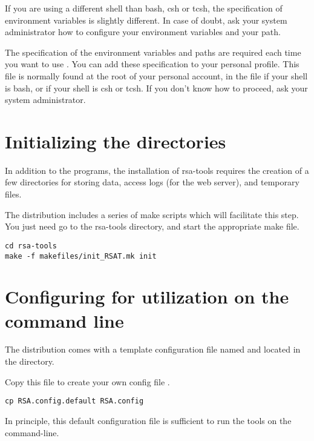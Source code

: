 \documentclass{article}
\begin{document}
If you are using a different shell than bash, csh or tcsh, the
specification of environment variables is slightly different.  In case
of doubt, ask your system administrator how to configure your
environment variables and your path.

The specification of the environment variables and paths are required
each time you want to use \RSAT. You can add these specification to
your personal profile.  This file is normally found at the root of
your personal account, in the file  if your shell is
bash, or  if your shell is csh or tcsh. If you don't know
how to proceed, ask your system administrator.



\section{Initializing the directories}

In addition to the programs, the installation of rsa-tools requires
the creation of a few directories for storing data, access logs (for
the web server), and temporary files.  

The distribution includes a series of make scripts which will
facilitate this step. You just need go to the rsa-tools directory, and
start the appropriate make file.

\begin{verbatim}
cd rsa-tools
make -f makefiles/init_RSAT.mk init
\end{verbatim}


\section{Configuring \RSAT for utilization on the command line}

The \RSAT distribution comes with a template configuration file named
 and located in the 
directory.

Copy this file to create your own config file .

\begin{verbatim}
cp RSA.config.default RSA.config
\end{verbatim}

In principle, this default configuration file is sufficient to run the
tools on the command-line. 
\end{document}
